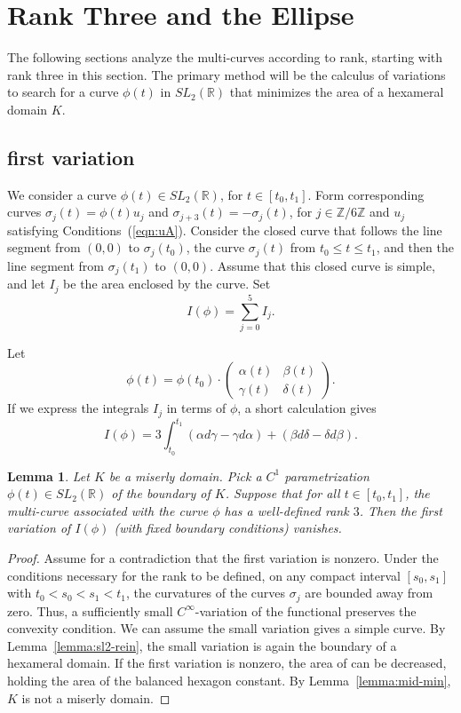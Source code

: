 \documentclass[11pt]{amsart}
\newtheorem{lemma}{Lemma}
\newcommand{\ring}[1]{\mathbb{#1}}
\begin{document}
\section{Rank Three and the Ellipse}

The following sections analyze the multi-curves according to rank,
starting with rank three in this section.
The primary method will be the calculus of variations  
to search for a curve $\phi(t)$ in $SL_2(\ring{R})$ that 
minimizes the area of a hexameral domain $K$.  

\subsection{first variation}

We consider a  curve $\phi(t)\in SL_2(\ring{R})$, for
$t\in[t_0,t_1]$.  Form  corresponding
curves $\sigma_j(t) = \phi(t) u_j$ and $\sigma_{j+3}(t) = -\sigma_j(t)$,
for $j\in\ring{Z}/6\ring{Z}$ and $u_j$ satisfying Conditions~(\ref{eqn:uA}).
Consider the closed curve that follows the
 line segment from $(0,0)$ to $\sigma_j(t_0)$,  the curve $\sigma_j(t)$
from $t_0\le t\le t_1$, and then the line segment from $\sigma_j(t_1)$ to $(0,0)$.    Assume that this closed curve is simple, and let $I_j$ be the area
enclosed by the curve.  Set
$$I(\phi) =\sum_{j=0}^5 I_j.$$

Let 
$$
\phi(t) = \phi(t_0)\cdot \begin{pmatrix} \alpha(t) & \beta(t) \\ \gamma(t) & \delta (t) \end{pmatrix}.
$$
If we express the integrals $I_j$ in terms of $\phi$, a short calculation gives
\begin{equation}\label{eqn:area-int}
I(\phi) = 3\int_{t_0}^{t_1} (\alpha d\gamma - \gamma d\alpha) + (\beta d\delta - \delta d\beta).
\end{equation}



\begin{lemma}  Let $K$ be a miserly domain. 
Pick a $C^1$ parametrization $\phi(t)\in SL_2(\ring{R})$
of the boundary of $K$.  Suppose that for all $t\in[t_0,t_1]$, the
multi-curve associated with the curve $\phi$
has a well-defined rank $3$.  Then the first variation of $I(\phi)$ (with fixed boundary conditions) vanishes. 
\end{lemma}

\begin{proof}  Assume for a contradiction that the first variation is nonzero. Under the conditions necessary for the rank
to be defined, on any compact interval $[s_0,s_1]$ with $t_0 < s_0 < s_1 < t_1$,
the curvatures of the curves $\sigma_j$ are bounded away from zero. 
Thus, a sufficiently 
small $C^\infty$-variation  of the functional preserves the convexity condition.  We can assume the small variation
gives a simple curve.  By Lemma~\ref{lemma:sl2-rein}, the small variation is again the boundary
of a hexameral domain.  If the first variation is nonzero, the area of can be decreased,
holding the area of the balanced hexagon constant.  By Lemma~\ref{lemma:mid-min}, $K$ is not a miserly domain.
\end{proof}
\end{document}
